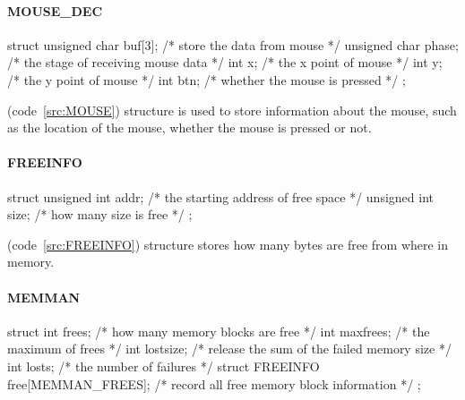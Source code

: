 \documentclass{swfcthesis}
\begin{document}
\paragraph{MOUSE\_DEC}

\begin{listing}[H]
  \begin{codeblock}
\begin{ccode}
struct 
{ 
  unsigned char buf[3]; /* store the data from mouse */
  unsigned char phase;  /* the stage of receiving mouse data */
  int x;                /* the x point of mouse */
  int y;                /* the y point of mouse */
  int btn;              /* whether the mouse is pressed */
};
\end{ccode}
  \end{codeblock}
  \caption{\texttt{struct MOUSE\_DEC}}\label{src:MOUSE}
\end{listing}

(code~\ref{src:MOUSE}) structure is used to store information about the mouse, such as the
location of the mouse, whether the mouse is pressed or not.

\paragraph{FREEINFO}

\begin{listing}[H]
  \begin{codeblock}
\begin{ccode}
struct 
{ 
  unsigned int addr; /* the starting address of free space */
  unsigned int size; /* how many size is free */
};
\end{ccode}
  \end{codeblock}
  \caption{\texttt{struct FREEINFO}}\label{src:FREEINFO}
\end{listing}

(code~\ref{src:FREEINFO}) structure stores how many bytes are
free from where in memory.




\paragraph{MEMMAN}

\begin{listing}[H]
  \begin{codeblock}
\begin{ccode}
struct 
{ 
  int frees;                           /* how many memory blocks are free */
  int maxfrees;                        /* the maximum of frees */
  int lostsize;                        /* release the sum of the failed memory size */
  int losts;                           /* the number of failures */
  struct FREEINFO free[MEMMAN_FREES];  /* record all free memory block information */
};
\end{ccode}
  \end{codeblock}
  \caption{\texttt{struct MEMMAN}}\label{src:MEMMAN}
\end{listing}
\end{document}
